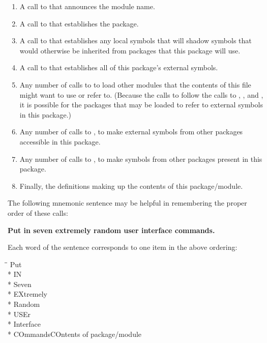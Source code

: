 \begin{enumerate}
\item
A call to  that announces the module name.

\item
A call to  that establishes the package.

\item
A call to  that establishes any local symbols that will shadow
symbols that would otherwise be inherited from packages that this
package will use.

\item
A call to  that establishes all of this package's external
symbols.

\item
Any number of calls to  to load other modules that the
contents of this file might want to use or refer to.  (Because the
calls to  follow the calls to ,
, and , it is possible for the packages that may
be loaded to refer to external symbols in this package.)

\item
Any number of calls to , to make external
symbols from other packages accessible in this package.

\item
Any number of calls to , to make
symbols from other packages present in this package.

\item
Finally, the definitions making up the contents of this package/module.
\end{enumerate}

The following mnemonic sentence may be helpful in remembering
the proper order of these calls:
\begin{center}
\textbf{Put in seven extremely random user interface commands.}
\end{center}
Each word of the sentence corresponds to one item in the above ordering:
\begin{tabbing}
\hskip 6pc\=\hskip 8pc\=\kill
\>Put\> \\*
\>IN\> \\*
\>Seven\> \\*
\>EXtremely\> \\*
\>Random\> \\*
\>USEr\> \\*
\>Interface\> \\*
\>COmmands\>COntents of package/module
\end{tabbing}



